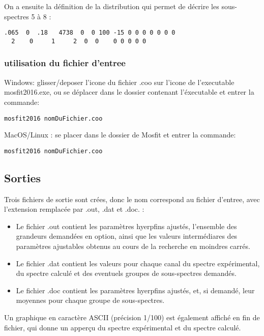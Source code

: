 On a ensuite la définition de la distribution qui permet de décrire les sous-spectres 5 à 8 :
\begin{lstlisting}[frame=single]
.065  0  .18   4738  0  0 100 -15 0 0 0 0 0 0 0
  2    0     1     2  0  0    0 0 0 0 0
\end{lstlisting}

\FloatBarrier


\subsubsection{utilisation du fichier d'entree}
Windows: glisser/deposer l'icone du fichier .coo sur l'icone de l'executable mosfit2016.exe, 
ou se déplacer dans le dossier contenant l'éxecutable et entrer la commande: 

\begin{lstlisting}[frame=single]
mosfit2016 nomDuFichier.coo
\end{lstlisting}

MacOS/Linux : se placer dans le dossier de Mosfit et entrer la commande: 

\begin{lstlisting}[frame=single]
mosfit2016 nomDuFichier.coo
\end{lstlisting}

\subsection{Sorties}
Trois fichiers de sortie sont crées, donc le nom correspond au fichier d'entree, avec l'extension remplacée par .out, .dat et .doc. :
\begin{itemize}
\item Le fichier .out contient les paramètres hyerpfins ajustés, l'ensemble des grandeurs demandées en option, ainsi que les valeurs intermédiares des paramètres ajustables obtenus au cours de la recherche en moindres carrés.
\item Le fichier .dat contient les valeurs pour chaque canal du spectre expérimental, du spectre calculé et des eventuels groupes de sous-spectres demandés.
\item Le fichier .doc contient les paramètres hyerpfins ajustés, et, si demandé, leur moyennes pour chaque groupe de sous-spectres. 
\end{itemize}
Un graphique en caractère ASCII (précision 1/100) est également affiché en fin de fichier, qui donne un apperçu du spectre expérimental et du spectre calculé.


